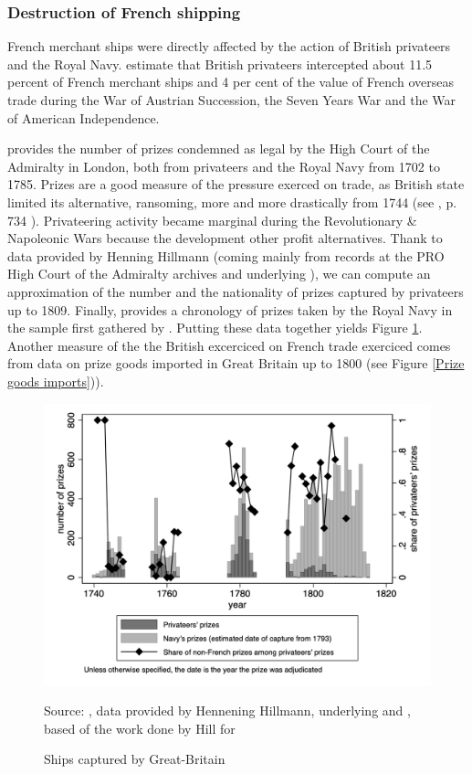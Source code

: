 \documentclass[12pt,a4paper,notitlepage,english]{article}
\newcommand{\source}[1]{\caption*{\footnotesize Source: {#1}} }
\begin{document}
\subsubsection{Destruction of French shipping}
French merchant ships were directly affected by the action of British privateers and the Royal Navy. 
\cite{Hillmann2011} estimate that British privateers intercepted about 11.5 percent of French merchant ships and 4 per cent of the value of French overseas trade during the War of Austrian Succession, the Seven Years War and the War of American Independence. 

\cite{Starkey1990} provides the number of prizes condemned as legal by the High Court of the Admiralty in London, both from privateers and the Royal Navy from 1702 to 1785. 
Prizes are a good measure of the pressure exerced on trade, as British state limited its alternative, ransoming, more and more drastically from 1744 (see \cite{Hillmann2011}, p. 734 ).
Privateering activity became marginal during the Revolutionary \& Napoleonic Wars because the development other profit alternatives.
Thank to data provided by Henning Hillmann (coming mainly from records at the PRO High Court of the Admiralty archives and underlying \cite{Hillmann2011}), we can compute an approximation of the number and the nationality of prizes captured by privateers up to 1809. Finally, \cite{Benjamin2009} provides a chronology of prizes taken by the Royal Navy in the sample first gathered by \cite{Hill1998}. Putting these data together yields Figure \ref{Prizes}.
Another measure of the the British excerciced on French trade exerciced comes from data on prize goods imported in Great Britain up to 1800 (see Figure \ref{Prize goods imports})).

\begin{center}
	\begin{figure}[H]
		\caption{Ships captured by Great-Britain}
		\label{Prizes}
		\centering
		\includegraphics[scale=0.7]{Prizes.png}
		\source{\cite{Starkey1990}, data provided by Hennening Hillmann, underlying \cite{Hillmann2011} and  \cite{Benjamin2009}, based of the work done by Hill for \cite{Hill1998}}
	\end{figure}
\end{center}
\end{document}
